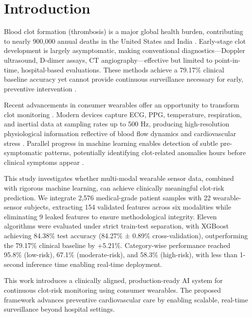 \documentclass[3p,times,procedia]{elsarticle}
\begin{document}
\vspace{3pt}

\section{Introduction}
\label{main}
\vspace{-3pt}
Blood clot formation (thrombosis) is a major global health burden, contributing to nearly 900,000 annual deaths in the United States and India \cite{anderson2003thrombosis,heit2016epidemiology}. Early-stage clot development is largely asymptomatic, making conventional diagnostics—Doppler ultrasound, D-dimer assays, CT angiography—effective but limited to point-in-time, hospital-based evaluations. These methods achieve a 79.17\% clinical baseline accuracy yet cannot provide continuous surveillance necessary for early, preventive intervention \cite{wells1997value}.

Recent advancements in consumer wearables offer an opportunity to transform clot monitoring \cite{piwek2016wearables,castaneda2018wearable}. Modern devices capture ECG, PPG, temperature, respiration, and inertial data at sampling rates up to 500 Hz, producing high-resolution physiological information reflective of blood flow dynamics and cardiovascular stress \cite{allen2007photoplethysmography}. Parallel progress in machine learning enables detection of subtle pre-symptomatic patterns, potentially identifying clot-related anomalies hours before clinical symptoms appear \cite{chen2016xgboost,esteva2019deep}.

This study investigates whether multi-modal wearable sensor data, combined with rigorous machine learning, can achieve clinically meaningful clot-risk prediction. We integrate 2,576 medical-grade patient samples with 22 wearable-sensor subjects, extracting 154 validated features across six modalities while eliminating 9 leaked features to ensure methodological integrity. Eleven algorithms were evaluated under strict train-test separation, with XGBoost achieving 84.38\% test accuracy (84.27\% ± 0.89\% cross-validation), outperforming the 79.17\% clinical baseline by +5.21\%. Category-wise performance reached 95.8\% (low-risk), 67.1\% (moderate-risk), and 58.3\% (high-risk), with less than 1-second inference time enabling real-time deployment.

\vspace{1pt}
This work introduces a clinically aligned, production-ready AI system for continuous clot-risk monitoring using consumer wearables. The proposed framework advances preventive cardiovascular care by enabling scalable, real-time surveillance beyond hospital settings.
\end{document}
